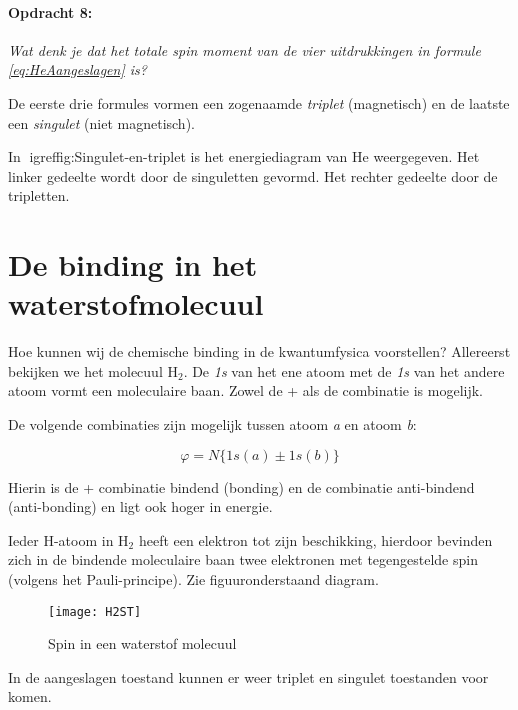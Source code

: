 \paragraph*{Opdracht 8:}

\emph{Wat denk je dat het totale spin moment van de vier uitdrukkingen
in formule \ref{eq:HeAangeslagen} is?}

De eerste drie formules vormen een zogenaamde \emph{triplet} (magnetisch)
en de laatste een \emph{singulet} (niet magnetisch).

In igref{fig:Singulet-en-triplet} is het energiediagram van
He weergegeven. Het linker gedeelte wordt door de singuletten gevormd.
Het rechter gedeelte door de tripletten.


\section{De binding in het waterstofmolecuul}

Hoe kunnen wij de chemische binding in de kwantumfysica voorstellen?
Allereerst bekijken we het molecuul $\mathrm{H}_{2}$. De \emph{1s}
van het ene atoom met de \emph{1s} van het andere atoom vormt een
moleculaire baan. Zowel de + als de \textendash{} combinatie is mogelijk.

De volgende combinaties zijn mogelijk tussen atoom \emph{a} en atoom
\emph{b}:

\begin{equation}
\varphi=N\{1s(a)\pm1s(b)\}
\end{equation}


Hierin is de + combinatie bindend (bonding) en de \textendash{} combinatie
anti-bindend (anti-bonding) en ligt ook hoger in energie.

Ieder H-atoom in $\mathrm{H}_{2}$ heeft een elektron tot zijn beschikking,
hierdoor bevinden zich in de bindende moleculaire baan twee elektronen
met tegengestelde spin (volgens het Pauli-principe). Zie figuuronderstaand
diagram.

\begin{figure}[h]
\noindent \begin{centering}
\texttt{[image: H2ST]}
\par\end{centering}

\caption{Spin in een waterstof molecuul}
\end{figure}


In de aangeslagen toestand kunnen er weer triplet en singulet toestanden
voor komen.


